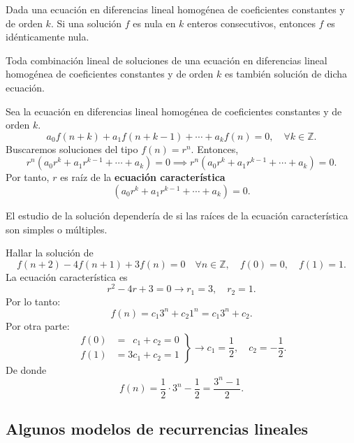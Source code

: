 \begin{theorem}{}
	Dada una ecuación en diferencias lineal homogénea de coeficientes constantes y de orden $k$. Si una solución $f$ es nula en $k$ enteros consecutivos, entonces $f$ es idénticamente nula.
\end{theorem}

\begin{theorem}{}
	Toda combinación lineal de soluciones de una ecuación en diferencias lineal homogénea de coeficientes constantes y de orden $k$ es también solución de dicha ecuación.
\end{theorem}

\begin{definition}
Sea la ecuación en diferencias lineal homogénea de coeficientes constantes y de orden $k$. \[ a_{0}f(n+k)+a_{1}f(n+k-1)+\cdots+a_{k}f(n)=0,\quad\forall k\in\mathds{Z}. \] Buscaremos soluciones del tipo $f(n)=r^{n}.$ Entonces, \[ r^{n}\left(a_{0}r^{k}+a_{1}r^{k-1}+\cdots+a_{k}\right)=0\implies r^{n}(a_{0}r^{k}+a_{1}r^{k-1}+\cdots+a_{k})=0. \] Por tanto, $r$ es raíz de la \textbf{ecuación característica} \[ (a_{0}r^{k}+a_{1}r^{k-1}+\cdots+a_{k})=0. \]
\end{definition}

El estudio de la solución dependería de si las raíces de la ecuación característica son simples o múltiples.
\begin{example}
	Hallar la solución de \[ f(n+2)-4f(n+1)+3f(n)=0\quad\forall n\in\mathds{Z},\quad f(0)=0,\quad f(1)=1. \] La ecuación característica es \[ r^{2}-4r+3=0\rightarrow r_{1}=3,\quad r_{2}=1. \] Por lo tanto: \[ f(n)=c_{1}3^{n}+c_{2}1^{n}=c_{1}3^{n}+c_{2}. \] Por otra parte:
	\begin{equation*}
	\left.\begin{aligned}
	f(0)&=\phantom{1}c_{1}+c_{2}=0\\
	f(1)&=3c_{1}+c_{2}=1
	\end{aligned}
	\right\}
	\longrightarrow c_{1}=\frac{1}{2},\quad c_{2}=-\frac{1}{2}.
	\end{equation*}
De donde \[ f(n)=\frac{1}{2}\cdot3^{n}-\frac{1}{2}=\frac{3^{n}-1}{2}. \]
\end{example}

\subsection{Algunos modelos de recurrencias lineales}\label{subsec:models}

